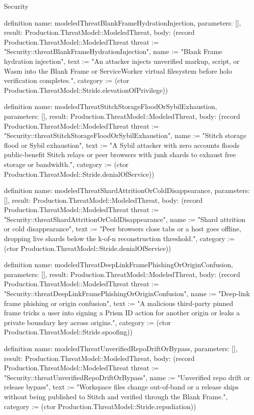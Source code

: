 \begin{lexlean}{Security}
\begin{semanticmodule}
definition{
  name: modeledThreatBlankFrameHydrationInjection,
  parameters: [],
  result: Production.ThreatModel::ModeledThreat,
  body: (record Production.ThreatModel::ModeledThreat {threat := "Security::threatBlankFrameHydrationInjection", name := "Blank Frame hydration injection", text := "An attacker injects unverified markup, script, or Wasm into the Blank Frame or ServiceWorker virtual filesystem before holo verification completes.", category := (ctor Production.ThreatModel::Stride.elevationOfPrivilege)})
}

definition{
  name: modeledThreatStitchStorageFloodOrSybilExhaustion,
  parameters: [],
  result: Production.ThreatModel::ModeledThreat,
  body: (record Production.ThreatModel::ModeledThreat {threat := "Security::threatStitchStorageFloodOrSybilExhaustion", name := "Stitch storage flood or Sybil exhaustion", text := "A Sybil attacker with zero accounts floods public-benefit Stitch relays or peer browsers with junk shards to exhaust free storage or bandwidth.", category := (ctor Production.ThreatModel::Stride.denialOfService)})
}

definition{
  name: modeledThreatShardAttritionOrColdDisappearance,
  parameters: [],
  result: Production.ThreatModel::ModeledThreat,
  body: (record Production.ThreatModel::ModeledThreat {threat := "Security::threatShardAttritionOrColdDisappearance", name := "Shard attrition or cold disappearance", text := "Peer browsers close tabs or a host goes offline, dropping live shards below the k-of-n reconstruction threshold.", category := (ctor Production.ThreatModel::Stride.denialOfService)})
}

definition{
  name: modeledThreatDeepLinkFramePhishingOrOriginConfusion,
  parameters: [],
  result: Production.ThreatModel::ModeledThreat,
  body: (record Production.ThreatModel::ModeledThreat {threat := "Security::threatDeepLinkFramePhishingOrOriginConfusion", name := "Deep-link frame phishing or origin confusion", text := "A malicious third-party pinned frame tricks a user into signing a Prism ID action for another origin or leaks a private boundary key across origins.", category := (ctor Production.ThreatModel::Stride.spoofing)})
}

definition{
  name: modeledThreatUnverifiedRepoDriftOrBypass,
  parameters: [],
  result: Production.ThreatModel::ModeledThreat,
  body: (record Production.ThreatModel::ModeledThreat {threat := "Security::threatUnverifiedRepoDriftOrBypass", name := "Unverified repo drift or release bypass", text := "Workspace files change out-of-band or a release ships without being published to Stitch and verified through the Blank Frame.", category := (ctor Production.ThreatModel::Stride.repudiation)})
}


\end{semanticmodule}
\end{lexlean}

